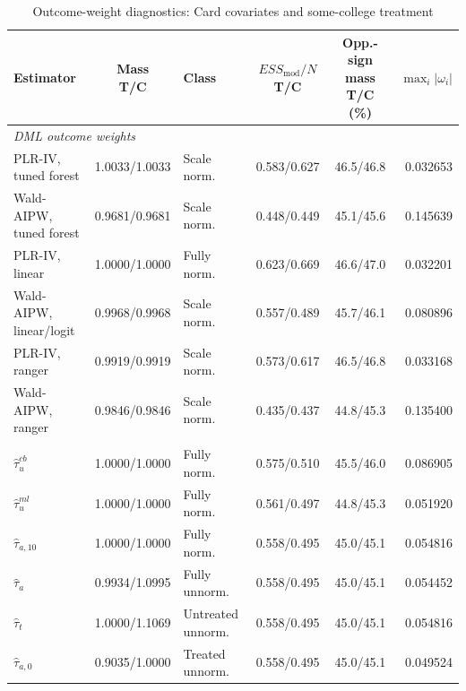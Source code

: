 \documentclass[12pt, a4paper, oneside]{article}
\theoremstyle{plain}
\theoremstyle{definition}
\begin{document}
\begin{table}[H]
    \centering
    \caption{Outcome-weight diagnostics: Card covariates and some-college treatment}
    \label{tab:card_weights_card_somecol}
    \scriptsize
    \setlength{\tabcolsep}{3pt}
    \renewcommand{\arraystretch}{0.93}
    \begin{tabular}{@{}lclccr@{}}
        \toprule
        Estimator &
        \shortstack{Mass\\T/C} &
        Class &
        \shortstack{$ESS_{\mathrm{mod}}/N$\\T/C} &
        \shortstack{Opp.-sign mass\\T/C (\%)} &
        $\max_i|\omega_i|$ \\
        \midrule
        \multicolumn{6}{l}{\textit{DML outcome weights}} \\
        PLR-IV, tuned forest
            & 1.0033/1.0033 & Scale norm.
            & 0.583/0.627 & 46.5/46.8 & 0.032653 \\
        Wald-AIPW, tuned forest
            & 0.9681/0.9681 & Scale norm.
            & 0.448/0.449 & 45.1/45.6 & 0.145639 \\
        PLR-IV, linear
            & 1.0000/1.0000 & Fully norm.
            & 0.623/0.669 & 46.6/47.0 & 0.032201 \\
        Wald-AIPW, linear/logit
            & 0.9968/0.9968 & Scale norm.
            & 0.557/0.489 & 45.7/46.1 & 0.080896 \\
        PLR-IV, ranger
            & 0.9919/0.9919 & Scale norm.
            & 0.573/0.617 & 46.5/46.8 & 0.033168 \\
        Wald-AIPW, ranger
            & 0.9846/0.9846 & Scale norm.
            & 0.435/0.437 & 44.8/45.3 & 0.135400 \\
        \addlinespace
        \multicolumn{6}{l}{\textit{Kappa outcome weights}} \\
        $\widehat{\tau}^{cb}_{u}$
            & 1.0000/1.0000 & Fully norm.
            & 0.575/0.510 & 45.5/46.0 & 0.086905 \\
        $\widehat{\tau}^{ml}_{u}$
            & 1.0000/1.0000 & Fully norm.
            & 0.561/0.497 & 44.8/45.3 & 0.051920 \\
        $\widehat{\tau}_{a,10}$
            & 1.0000/1.0000 & Fully norm.
            & 0.558/0.495 & 45.0/45.1 & 0.054816 \\
        $\widehat{\tau}_{a}$
            & 0.9934/1.0995 & Fully unnorm.
            & 0.558/0.495 & 45.0/45.1 & 0.054452 \\
        $\widehat{\tau}_{t}$
            & 1.0000/1.1069 & Untreated unnorm.
            & 0.558/0.495 & 45.0/45.1 & 0.054816 \\
        $\widehat{\tau}_{a,0}$
            & 0.9035/1.0000 & Treated unnorm.
            & 0.558/0.495 & 45.0/45.1 & 0.049524 \\
        \bottomrule
    \end{tabular}
\end{table}
\end{document}
